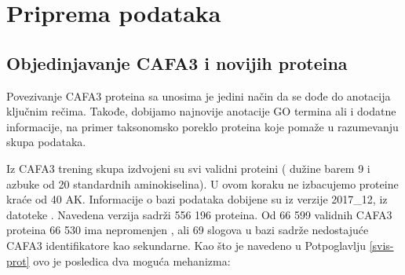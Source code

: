 
\chapter{Priprema podataka} %

\label{Priprema_podataka} %

\section{Objedinjavanje CAFA3 i novijih \swissprot proteina}
\label{objedinjavanje}

Povezivanje CAFA3 proteina sa \swissprot unosima je jedini način da se dođe do
anotacija ključnim rečima. Takođe, dobijamo najnovije anotacije GO termina ali
i dodatne informacije, na primer taksonomsko poreklo proteina koje pomaže
u razumevanju skupa podataka.

Iz CAFA3 trening skupa izdvojeni su svi validni proteini ( dužine barem 9 i
azbuke od 20 standardnih aminokiselina). U ovom koraku ne izbacujemo proteine
kraće od 40 AK.  Informacije o \swissprot bazi podataka dobijene su iz verzije
2017\_12, iz datoteke  \cite{sprot}.
Navedena verzija sadrži 556 196 proteina.  Od 66 599 validnih CAFA3 proteina 66
530 ima nepromenjen , ali 69 slogova u
\swissprot bazi sadrže nedostajuće CAFA3 identifikatore kao sekundarne. Kao što
je navedeno u Potpoglavlju \ref{svis-prot} ovo je posledica dva moguća
mehanizma:

